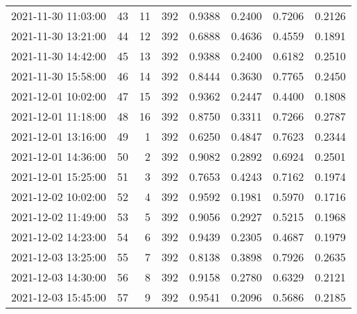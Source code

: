\begin{longtable}{lrrrrrrr}
2021-11-30 11:03:00 &   43 &   11 &    392 &   0.9388 & 0.2400 & 0.7206 & 0.2126 \\
2021-11-30 13:21:00 &   44 &   12 &    392 &   0.6888 & 0.4636 & 0.4559 & 0.1891 \\
2021-11-30 14:42:00 &   45 &   13 &    392 &   0.9388 & 0.2400 & 0.6182 & 0.2510 \\
2021-11-30 15:58:00 &   46 &   14 &    392 &   0.8444 & 0.3630 & 0.7765 & 0.2450 \\
2021-12-01 10:02:00 &   47 &   15 &    392 &   0.9362 & 0.2447 & 0.4400 & 0.1808 \\
2021-12-01 11:18:00 &   48 &   16 &    392 &   0.8750 & 0.3311 & 0.7266 & 0.2787 \\
2021-12-01 13:16:00 &   49 &    1 &    392 &   0.6250 & 0.4847 & 0.7623 & 0.2344 \\
2021-12-01 14:36:00 &   50 &    2 &    392 &   0.9082 & 0.2892 & 0.6924 & 0.2501 \\
2021-12-01 15:25:00 &   51 &    3 &    392 &   0.7653 & 0.4243 & 0.7162 & 0.1974 \\
2021-12-02 10:02:00 &   52 &    4 &    392 &   0.9592 & 0.1981 & 0.5970 & 0.1716 \\
2021-12-02 11:49:00 &   53 &    5 &    392 &   0.9056 & 0.2927 & 0.5215 & 0.1968 \\
2021-12-02 14:23:00 &   54 &    6 &    392 &   0.9439 & 0.2305 & 0.4687 & 0.1979 \\
2021-12-03 13:25:00 &   55 &    7 &    392 &   0.8138 & 0.3898 & 0.7926 & 0.2635 \\
2021-12-03 14:30:00 &   56 &    8 &    392 &   0.9158 & 0.2780 & 0.6329 & 0.2121 \\
2021-12-03 15:45:00 &   57 &    9 &    392 &   0.9541 & 0.2096 & 0.5686 & 0.2185 \\
\end{longtable}
